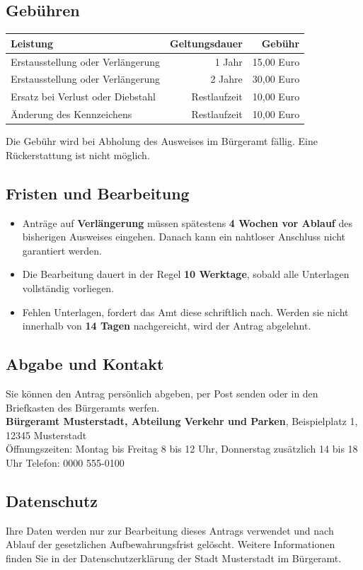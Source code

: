 \documentclass[10pt,a4paper]{article}
\begin{document}
\subsection*{Gebühren}
\begin{center}
\small
\begin{tabular}{@{}l r r@{}}
  \toprule
  \textbf{Leistung} & \textbf{Geltungsdauer} & \textbf{Gebühr} \\
  \midrule
  Erstausstellung oder Verlängerung & 1 Jahr & 15,00 Euro \\
  Erstausstellung oder Verlängerung & 2 Jahre & 30,00 Euro \\
  Ersatz bei Verlust oder Diebstahl & Restlaufzeit & 10,00 Euro \\
  Änderung des Kennzeichens & Restlaufzeit & 10,00 Euro \\
  \bottomrule
\end{tabular}
\end{center}
Die Gebühr wird bei Abholung des Ausweises im Bürgeramt fällig. Eine Rückerstattung ist nicht möglich.

\subsection*{Fristen und Bearbeitung}
\begin{itemize}[leftmargin=1.4em, itemsep=0.2em]
  \item Anträge auf \textbf{Verlängerung} müssen spätestens \textbf{4 Wochen vor Ablauf} des bisherigen Ausweises
        eingehen. Danach kann ein nahtloser Anschluss nicht garantiert werden.
  \item Die Bearbeitung dauert in der Regel \textbf{10 Werktage}, sobald alle Unterlagen vollständig vorliegen.
  \item Fehlen Unterlagen, fordert das Amt diese schriftlich nach. Werden sie nicht innerhalb von \textbf{14 Tagen}
        nachgereicht, wird der Antrag abgelehnt.
\end{itemize}

\subsection*{Abgabe und Kontakt}
Sie können den Antrag persönlich abgeben, per Post senden oder in den Briefkasten des Bürgeramts werfen.\\
\textbf{Bürgeramt Musterstadt, Abteilung Verkehr und Parken}, Beispielplatz 1, 12345 Musterstadt\\
Öffnungszeiten: Montag bis Freitag 8 bis 12 Uhr, Donnerstag zusätzlich 14 bis 18 Uhr \quad Telefon: 0000 555-0100

\subsection*{Datenschutz}
\small Ihre Daten werden nur zur Bearbeitung dieses Antrags verwendet und nach Ablauf der gesetzlichen Aufbewahrungsfrist
gelöscht. Weitere Informationen finden Sie in der Datenschutzerklärung der Stadt Musterstadt im Bürgeramt.
\end{document}
